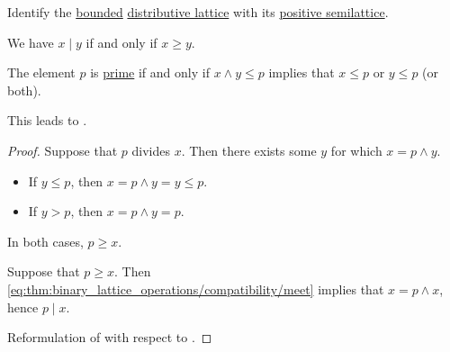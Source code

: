 \begin{proposition}\label{thm:lattice_divisibility}
  Identify the \hyperref[def:semilattice/bounded]{bounded} \hyperref[def:semilattice/distributive_lattice]{distributive lattice} with its \hyperref[ex:def:semiring/lattice]{positive semilattice}.

  \begin{thmenum}
     We have \( x \mid y \) if and only if \( x \geq y \).

     The element \( p \) is \hyperref[def:domain_divisibility/prime]{prime} if and only if \( x \wedge y \leq p \) implies that \( x \leq p \) or \( y \leq p \) (or both).

    This leads to .
  \end{thmenum}
\end{proposition}
\begin{proof}
  \SufficiencySubProof* Suppose that \( p \) divides \( x \). Then there exists some \( y \) for which \( x = p \wedge y \).
  \begin{itemize}
    \item If \( y \leq p \), then \( x = p \wedge y = y \leq p \).
    \item If \( y > p \), then \( x = p \wedge y = p \).
  \end{itemize}

  In both cases, \( p \geq x \).

  \NecessitySubProof* Suppose that \( p \geq x \). Then \eqref{eq:thm:binary_lattice_operations/compatibility/meet} implies that \( x = p \wedge x \), hence \( p \mid x \).

   Reformulation of  with respect to .
\end{proof}

